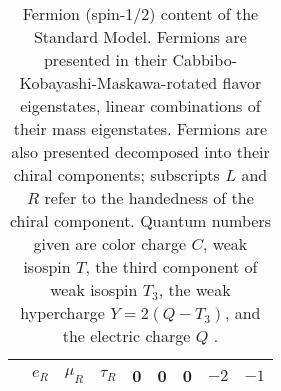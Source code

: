 \begin{table}[p]
\begin{tabular}{cccc|ccccc}
                      &
    $e_R$    &
    $\mu_R$  &
    $\tau_R$ &
    0 & 0 & 0 & $-2$ & $-1$ \\[.2em]
    \hline
  \end{tabular}
  \caption[Fermion (spin-1/2) content of the Standard Model.]{Fermion (spin-1/2) content of the Standard Model. Fermions are presented in their \mbox{Cabbibo-Kobayashi-Maskawa}-rotated flavor eigenstates, linear combinations of their mass eigenstates. Fermions are also presented decomposed into their chiral components; subscripts $L$ and $R$ refer to the handedness of the chiral component. Quantum numbers given are color charge $C$, weak isospin $T$, the third component of weak isospin $T_3$, the weak hypercharge $Y = 2(Q-T_3)$, and the electric charge $Q$ \cite{Srednicki, PDG:Electroweak}.}
  \label{tab:sm:fermions}
\end{table}

